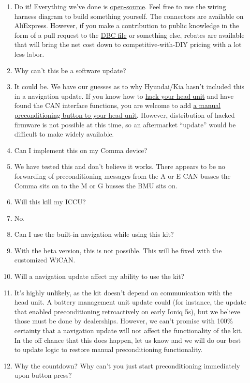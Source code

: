 \documentclass[superscriptaddress,onecolumn,floatfix]{revtex4-2}
\begin{document}
\begin{enumerate}
  \item[A:] Do it! Everything we've done is \href{https://github.com/tylerharvey/Ioniq5_CAN}{open-source}. Feel free to use the wiring harness diagram to build something yourself. The connectors are available on AliExpress. However, if you make a contribution to public knowledge in the form of a pull request to the \href{https://github.com/dragz/egmpdbc}{DBC file} or something else, rebates are available that will bring the net cost down to competitive-with-DIY pricing with a lot less labor.
  \item[Q:] Why can't this be a software update?
  \item[A:] It could be. We have our guesses as to why Hyundai/Kia hasn't included this in a navigation update. If you  know how to \href{https://discord.gg/zyrngQ5qQ}{hack your head unit} and have found the CAN interface functions, you are welcome to add \href{https://www.reddit.com/r/KiaEV6/comments/1jdd56u/comment/mid9xie/}{a manual preconditioning button to your head unit}. However, distribution of hacked firmware is not possible at this time, so an aftermarket ``update'' would be difficult to make widely available.
  \item[Q:] Can I implement this on my Comma device?
  \item[A:] We have tested this and don't believe it works. There appears to be no forwarding of preconditioning messages from the A or E CAN busses the Comma sits on to the M or G busses the BMU sits on.
  \item[Q:] Will this kill my ICCU?
  \item[A:] No.
  \item[Q:] Can I use the built-in navigation while using this kit?
  \item[A:] With the beta version, this is not possible. This will be fixed with the customized WiCAN.
  \item[Q:] Will a navigation update affect my ability to use the kit?
  \item[A:] It's highly unlikely, as the kit doesn't depend on communication with the head unit. A battery management unit update could (for instance, the update that enabled preconditioning retroactively on early Ioniq 5s), but we believe those must be done by dealerships. However, we can't promise with 100\% certainty that a navigation update will not affect the functionality of the kit. In the off chance that this does happen, let us know and we will do our best to update logic to restore manual preconditioning functionality.
  \item[Q:] Why the countdown? Why can't you just start preconditioning immediately upon button press?

\end{enumerate}
\end{document}
